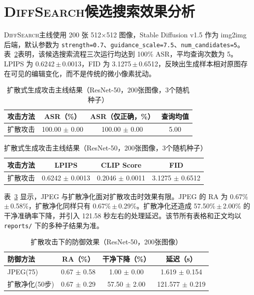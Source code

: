 \documentclass[type=bachelor,oneside]{fduthesis}
\newcommand{\methodname}{\textsc{DiffSearch}}
\newcommand{\tablefont}{\small}
\begin{document}
\section{\methodname 候选搜索效果分析}

\methodname 主线使用 200 张 512$\times$512 图像，Stable Diffusion v1.5 作为 img2img 后端，默认参数为 \texttt{strength=0.7}、\texttt{guidance\_\allowbreak scale=7.5}、\texttt{num\_\allowbreak candidates=5}。表~\ref{tab:diff_attack_new}表明，该候选搜索流程三次运行均达到 100\% ASR，平均查询次数为 5。LPIPS 为 0.6242\,$\pm$\,0.0013，FID 为 3.1275\,$\pm$\,0.6512，反映出生成样本相对原图存在可见的编辑变化，而不是传统的微小像素扰动。

\begin{table}[htbp]
  \centering
  \caption{扩散式生成攻击主线结果（ResNet-50，200张图像，3个随机种子）}
  \label{tab:diff_attack_new}
  \tablefont
  \setlength{\tabcolsep}{3pt}
  \renewcommand{\arraystretch}{1.15}
  \begin{tabular}{lccc}
    \toprule
    攻击方法 & ASR（\%） & ASR（仅正确，\%） & 查询均值 \\
    \midrule
    扩散攻击 & 100.00 $\pm$ 0.00 & 100.00 $\pm$ 0.00 & 5.00 \\
    \bottomrule
  \end{tabular}

  \vspace{0.6em}

  \begin{tabular}{lccc}
    \toprule
    攻击方法 & LPIPS & CLIP Score & FID \\
    \midrule
    扩散攻击 & 0.6242 $\pm$ 0.0013 & 0.2046 $\pm$ 0.0011 & 3.1275 $\pm$ 0.6512 \\
    \bottomrule
  \end{tabular}
\end{table}

表~\ref{tab:diff_defense_new} 显示，JPEG 与扩散净化面对扩散攻击时效果有限。JPEG 的 RA 为 0.67\%\,$\pm$\,0.58\%，扩散净化同样只有 0.67\%\,$\pm$\,0.29\%。扩散净化还造成 57.50\%\,$\pm$\,2.00\% 的干净准确率下降，并引入 121.58 秒左右的处理延迟。该节所有表格和正文均以 \texttt{reports/} 下的多种子结果为准。

\begin{table}[htbp]
  \centering
  \caption{扩散攻击下的防御效果（ResNet-50，200张图像）}
  \label{tab:diff_defense_new}
  \tablefont
  \setlength{\tabcolsep}{4pt}
  \begin{tabular}{lccc}
    \toprule
    防御方法 & RA（\%） & 干净下降（\%） & 延迟（s） \\
    \midrule
    JPEG(75) & 0.67 $\pm$ 0.58 & 1.00 $\pm$ 0.00 & 1.619 $\pm$ 0.154 \\
    扩散净化(50步) & 0.67 $\pm$ 0.29 & 57.50 $\pm$ 2.00 & 121.577 $\pm$ 0.219 \\
    \bottomrule
  \end{tabular}
\end{table}
\end{document}
